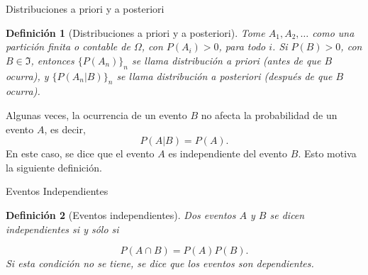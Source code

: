\documentclass{beamer}
\newtheorem{defi}{Definición}[section]
\begin{document}
	\begin{frame}{Distribuciones a priori y a posteriori}
	\begin{defi}[Distribuciones a priori y a posteriori]
		Tome $A_1,A_2,\dots$ como una partición finita o contable de $\Omega$, con $P(A_i)>0$, para todo $i$. Si $P(B)>0$, con $B\in\Im$, entonces $\{P(A_n)\}_n$ se llama distribución a priori (antes de que $B$ ocurra), y $\{P(A_n|B)\}_n$ se llama distribución a posteriori (después de que $B$ ocurra).
	\end{defi}
	Algunas veces, la ocurrencia de un evento $B$ no afecta la probabilidad de un evento $A$, es decir,
	$$P(A|B)=P(A).$$
	En este caso, se dice que el evento $A$ es independiente del evento $B$. Esto motiva la siguiente definición.
	\end{frame}
	
	\begin{frame}[allowframebreaks]{Eventos Independientes}
	\begin{defi}[Eventos independientes]
		Dos eventos $A$ y $B$ se dicen independientes si y sólo si
		
		$$P(A\cap B)=P(A)P(B).$$
		Si esta condición no se tiene, se dice que los eventos son dependientes.
	\end{defi}
	\end{frame}
\end{document}
